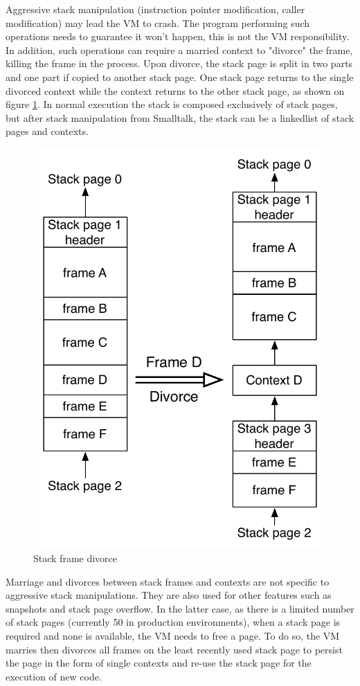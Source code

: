 \documentclass[a4paper,12pt,twoside]{../includes/ThesisStyle}
\begin{document}
Aggressive stack manipulation (instruction pointer modification, caller modification) may lead the VM to crash. The program performing such operations needs to guarantee it won't happen, this is not the VM responsibility. In addition, such operations can require a married context to "divorce" the frame, killing the frame in the process. Upon divorce, the stack page is split in two parts and one part if copied to another stack page. One stack page returns to the single divorced context while the context returns to the other stack page, as shown on figure \ref{fig:Divorce}. In normal execution the stack is composed exclusively of stack pages, but after stack manipulation from Smalltalk, the stack can be a linkedlist of stack pages and contexts. 

\begin{figure}[h!]
    \begin{center}
        \includegraphics[width=0.55\linewidth]{Divorce}
        \caption{Stack frame divorce}
        \label{fig:Divorce}
    \end{center}
\end{figure}


Marriage and divorces between stack frames and contexts are not specific to aggressive stack manipulations. They are also used for other features such as snapshots and stack page overflow. In the latter case, as there is a limited number of stack pages (currently 50 in production environments), when a stack page is required and none is available, the VM needs to free a page. To do so, the VM marries then divorces all frames on the least recently used stack page to persist the page in the form of single contexts and re-use the stack page for the execution of new code. 
\end{document}
